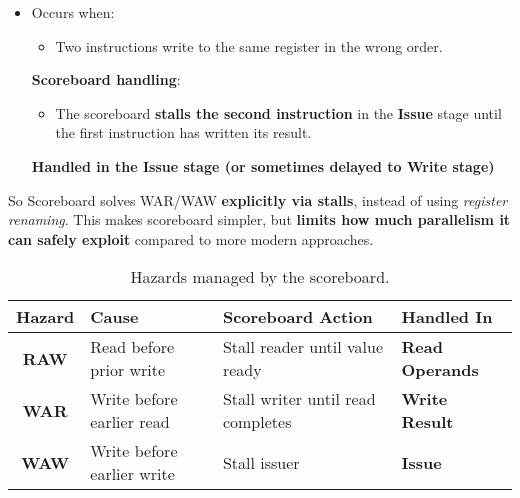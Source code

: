 \begin{itemize}[label=\textcolor{Green3}{}]
    \item {}
    
    Occurs when:
    \begin{itemize}
        \item Two instructions write to the same register in the wrong order.
    \end{itemize}
    \textbf{Scoreboard handling}:
    \begin{itemize}
        \item The scoreboard \textbf{stalls the second instruction} in the \textbf{Issue} stage until the first instruction has written its result.
    \end{itemize}
    \textcolor{Green3}{ \textbf{Handled in the Issue stage (or sometimes delayed to Write stage)}}
\end{itemize}
So Scoreboard solves WAR/WAW \textbf{explicitly via stalls}, instead of using \emph{register renaming}. This makes scoreboard simpler, but \textbf{limits how much parallelism it can safely exploit} compared to more modern approaches.

\highspace
\begin{table}[!htp]
    \centering
    \begin{adjustbox}{width={\textwidth},totalheight={\textheight},keepaspectratio}
        \begin{tabular}{@{} c | l | l | l @{}}
            \toprule
            Hazard & Cause & Scoreboard Action & Handled In \\
            \midrule
            \textbf{RAW}    & Read before prior write       & Stall reader until value ready    & \textbf{Read Operands} \\ [.3em]
            \textbf{WAR}    & Write before earlier read     & Stall writer until read completes & \textbf{Write Result} \\ [.3em]
            \textbf{WAW}    & Write before earlier write    & Stall issuer                      & \textbf{Issue} \\
            \bottomrule
        \end{tabular}
    \end{adjustbox}
    \caption{Hazards managed by the scoreboard.}
\end{table}